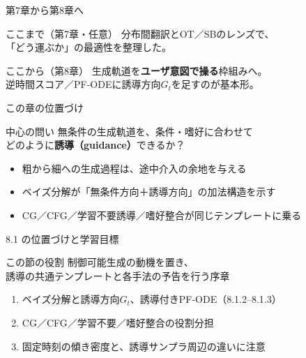 

\begin{frame}{第7章から第8章へ}
    \begin{block}{ここまで（第7章・任意）}
        分布間翻訳とOT／SBのレンズで、\\
        「どう運ぶか」の最適性を整理した。
    \end{block}
    \begin{block}{ここから（第8章）}
        生成軌道を\textbf{ユーザ意図で操る}枠組みへ。\\
        逆時間スコア／PF-ODEに誘導方向$G_t$を足すのが基本形。
    \end{block}
\end{frame}
\asmain
\begin{frame}{この章の位置づけ}
    \begin{block}{中心の問い}
        無条件の生成軌道を、条件・嗜好に合わせて\\
        どのように\textbf{誘導（guidance）}できるか？
    \end{block}
    \begin{itemize}
        \item 粗から細への生成過程は、途中介入の余地を与える
        \item ベイズ分解が「無条件方向＋誘導方向」の加法構造を示す
        \item CG／CFG／学習不要誘導／嗜好整合が同じテンプレートに乗る
    \end{itemize}
\end{frame}
\asmain
\begin{frame}{8.1 の位置づけと学習目標}
    \begin{block}{この節の役割}
        制御可能生成の動機を置き、\\
        誘導の共通テンプレートと各手法の予告を行う序章
    \end{block}
    \begin{enumerate}
        \item ベイズ分解と誘導方向$G_t$、誘導付きPF-ODE（8.1.2--8.1.3）
        \item CG／CFG／学習不要／嗜好整合の役割分担
        \item 固定時刻の傾き密度と、誘導サンプラ周辺の違いに注意
    \end{enumerate}
\end{frame}

